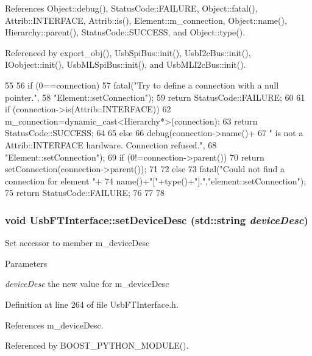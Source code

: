 References Object::debug(), StatusCode::FAILURE, Object::fatal(), Attrib::INTERFACE, Attrib::is(), Element::m\_\-connection, Object::name(), Hierarchy::parent(), StatusCode::SUCCESS, and Object::type().

Referenced by export\_\-obj(), UsbSpiBus::init(), UsbI2cBus::init(), IOobject::init(), UsbMLSpiBus::init(), and UsbMLI2cBus::init().


\begin{DoxyCode}
55                                                       {
56   if (0==connection){
57     fatal("Try to define a connection with a null pointer.",
58         "Element::setConnection");
59     return StatusCode::FAILURE;
60   }
61   if (connection->is(Attrib::INTERFACE)){
62     m_connection=dynamic_cast<Hierarchy*>(connection);
63     return StatusCode::SUCCESS;
64   }
65   else {
66     debug(connection->name()+
67         " is not a Attrib::INTERFACE hardware. Connection refused.",
68         "Element::setConnection");
69     if (0!=connection->parent()){
70       return setConnection(connection->parent());
71     }
72     else{
73       fatal("Could not find a connection for element "+
74           name()+"["+type()+"].","element::setConnection");
75       return StatusCode::FAILURE;
76     }
77   }
78 }
\end{DoxyCode}
\hypertarget{classUsbFTInterface_abb106a3d2c48826f96ec2ac10d029132}{
\subsubsection[{setDeviceDesc}]{\setlength{\rightskip}{0pt plus 5cm}void UsbFTInterface::setDeviceDesc (std::string {\em deviceDesc})}}
\label{classUsbFTInterface_abb106a3d2c48826f96ec2ac10d029132}
Set accessor to member m\_\-deviceDesc 
\begin{DoxyParams}{Parameters}
\item[{\em deviceDesc}]the new value for m\_\-deviceDesc \end{DoxyParams}


Definition at line 264 of file UsbFTInterface.h.

References m\_\-deviceDesc.

Referenced by BOOST\_\-PYTHON\_\-MODULE().


